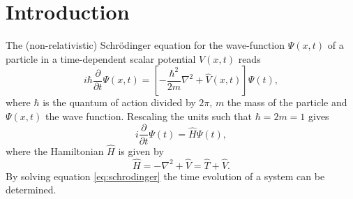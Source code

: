 \section*{Introduction}
The (non-relativistic) Schr\"{o}dinger equation for the wave-function $\Psi(x,t)$ of a particle in a time-dependent scalar potential $V(x,t)$ reads 
\[
i\hbar \frac{\partial}{\partial t}\Psi(x,t) = \left[-\frac{\hbar^2}{2m}\nabla^2+\hat{V}(x,t)\right]\Psi(t),
\]
where $\hbar$ is the quantum of action divided by $2\pi$, $m$ the mass of the particle and $\Psi(x,t)$ the wave function.
Rescaling the units such that $\hbar = 2m = 1$ gives
\begin{equation}\label{eq:schrodinger}
i \frac{\partial}{\partial t}\Psi(t) = \hat{H}\Psi(t),
\end{equation}where the Hamiltonian $\hat{H}$ is given by
\[
\hat{H} = -\nabla^2+\hat{V} = \hat{T}+\hat{V}.
\] By solving equation \ref{eq:schrodinger} the time evolution of a system can be determined.